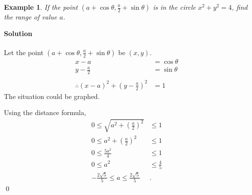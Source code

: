 \documentclass{article}
\newtheorem*{example*}{Example}
\newenvironment{solution}{\begin{trivlist}\item[]{\bf Solution}}{\qed \end{trivlist}}
\begin{document}
\newpage
\begin{example*}
    If the point $\left( a + \cos\theta, \frac{a}{2} + \sin\theta \right)$ is in the circle $x^2 + y^2 = 4$, find the range of value $a$.
\end{example*}
\begin{solution} \\\\
    Let the point $\left( a + \cos\theta, \frac{a}{2} + \sin\theta \right)$ be $(x,y)$.
    \begin{align*}
        x - a &= \cos\theta \\
        y - \frac{a}{2} &= \sin\theta
        \\\\
        \therefore (x - a)^2 + \left( y - \frac{a}{2} \right)^2 &= 1
    \end{align*}
    The situation could be graphed.
    \begin{center}
    \end{center}
    Using the distance formula,
    \begin{align*}
        0 \le \sqrt{a^2 + \left( \frac{a}{2} \right)^2} &\le 1 \\
        0 \le a^2 + \left( \frac{a}{2} \right)^2 &\le 1 \\
        0 \le \frac{5a^2}{4} &\le 1 \\
        0 \le a^2 &\le \frac{4}{5} \\
        \boxed{-\frac{2\sqrt{5}}{5} \le a \le \frac{2\sqrt{5}}{5}}&.
    \end{align*}
\end{solution}
\end{document}

